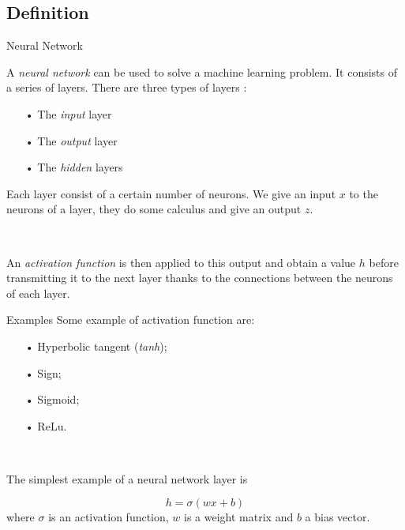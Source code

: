 \documentclass[11pt]{beamer}
\begin{document}
\subsection{Definition}
\begin{frame}{Neural Network}
\begin{definition}
A \textit{neural network} \cite{8} can be used to solve a machine learning problem. It consists of a series of layers. There are three types of layers :

\begin{itemize}
\item[•] The \textit{input} layer
\item[•] The \textit{output} layer
\item[•] The \textit{hidden} layers
\end{itemize}
Each layer consist of a certain number of neurons. We give an input $x$ to the neurons of a layer, they do some calculus and give an output $z$.

~

An \textit{activation function} is then applied to this output and obtain a value $h$ before transmitting it to the next layer thanks to the connections between the neurons of each layer.
\end{definition}
\end{frame}

\begin{frame}{Examples}
Some example of activation function are:
\begin{itemize}
\item[•] Hyperbolic tangent (\textit{tanh});
\item[•] Sign;
\item[•] Sigmoid;
\item[•] ReLu.
\end{itemize}

~

The simplest example of a neural network layer is 

$$
h = \sigma (wx +b)
$$
where $\sigma$ is an activation function, $w$ is a weight matrix and $b$ a bias vector.
\end{frame}
\end{document}
